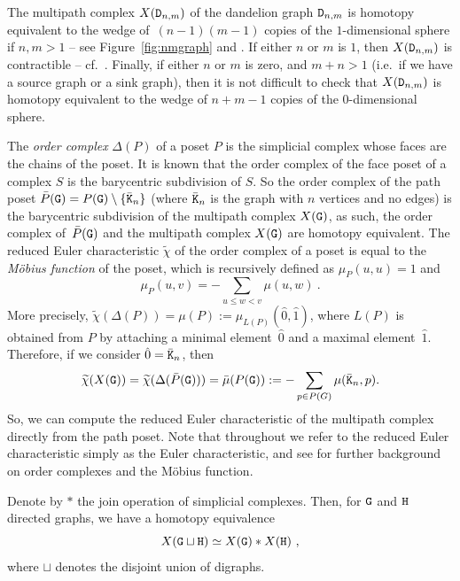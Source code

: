 \documentclass{amsart}
\begin{document}
\begin{example}
The multipath complex $X({\tt D}_{n,m})$ of the dandelion graph ${\tt D}_{n,m}$ is homotopy equivalent to the wedge of~$(n-1)(m-1)$ copies of the $1$-dimensional sphere if $n,m>1$ -- see Figure~\ref{fig:nmgraph} and \cite[Example~6.13]{secondo}. If either $n$ or $m$ is $1$, then $X({\tt D}_{n,m})$ is contractible -- cf.~\cite[Proposition~4.18]{secondo}. Finally, if either $n$ or $m$ is zero, and $m + n > 1$ (i.e.~if we have a source graph or a sink graph), then it is not difficult to check that $X({\tt D}_{n,m})$ is homotopy equivalent to the wedge of $n + m -1$ copies of the $0$-dimensional sphere. 
\end{example}






The \emph{order complex} $\Delta(P)$ of a poset $P$ is the simplicial complex whose faces are the chains of the poset. It is known that the order complex of the face poset of a complex $S$ is the barycentric subdivision of $S$. So the  order complex of the path poset $\bar{P}({\tt G})=P({\tt G})\setminus\{ \bar{{\tt K}}_n\}$ (where $\bar{{\tt K}}_n$ is the graph with $n$ vertices and no edges) is the barycentric subdivision of the multipath complex $X({\tt G})$, as such, the order complex of~$\bar{P}({\tt G})$ and the multipath complex $X({\tt G})$ are homotopy equivalent. The reduced Euler characteristic $\widetilde{\chi}$ of the order complex of a poset is equal to the \emph{M\"obius function} of the poset, which is recursively defined as $\mu_P(u,u)=1$ and $$\mu_P(u,v)=-\sum_{u\le w<v}\mu(u,w)\ .$$
More precisely,  $\widetilde{\chi}(\Delta(P))=\mu(P):=\mu_{L(P)}(\hat{0},\hat{1})$, where $L(P)$ is obtained from $P$ by attaching a minimal element~$\hat{0}$ and a maximal element~$\hat{1}$.  
Therefore, if we consider $\hat{0}=\bar{{\tt K}}_n$, then
\begin{equation}\label{eq:moebiuschar}
\widetilde{\chi}(X({\tt G}))=\widetilde{\chi}(\Delta(\bar{P}({\tt G})))=\bar{\mu}(P({\tt G})):=-\sum_{p\in P(G)}\mu(\bar{{\tt K}}_n,p) .
\end{equation}
So, we can compute the reduced Euler characteristic of the multipath complex directly from the path poset. Note that throughout we refer to the reduced Euler characteristic simply as the Euler characteristic, and see \cite{Wac07} for further background on order complexes and the M\"obius function. 



\begin{rem}
Denote by $\ast$ the join operation of simplicial complexes. Then, for ${\tt G}$ and ${\tt H}$ directed graphs, we have a homotopy equivalence 
\[
X({\tt G}\sqcup {\tt H})\simeq X({\tt G})\ast X({\tt H}) \ ,
\]
where $\sqcup$ denotes the disjoint union of digraphs.
\end{rem}
\end{document}

